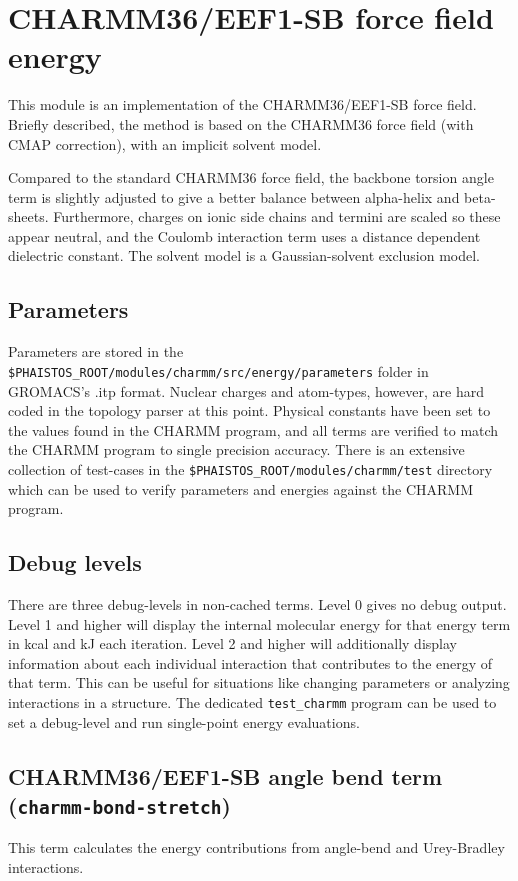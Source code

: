 \section{CHARMM36/EEF1-SB force field energy}

This module is an implementation of the CHARMM36/EEF1-SB force field\cite{doi:10.1021/ct400730n}.
Briefly described, the method is based on the CHARMM36 force field (with CMAP correction), with an implicit solvent model.

Compared to the standard CHARMM36 force field, the backbone torsion angle term is slightly adjusted to give a better balance between alpha-helix and beta-sheets.
Furthermore, charges on ionic side chains and termini are scaled so these appear neutral, and the Coulomb interaction term uses a distance dependent dielectric constant.
The solvent model is a Gaussian-solvent exclusion model.

\subsection{Parameters}
Parameters are stored in the \texttt{\$PHAISTOS\_ROOT/modules/charmm/src/energy/parameters} folder in GROMACS's .itp format.
Nuclear charges and atom-types, however, are hard coded in the topology parser at this point.
Physical constants have been set to the values found in the CHARMM program, and all terms are verified to match the CHARMM program to single precision accuracy.
There is an extensive collection of test-cases in the \texttt{\$PHAISTOS\_ROOT/modules/charmm/test} directory which can be used to verify parameters and energies against the CHARMM program.


\subsection{Debug levels}
There are three debug-levels in non-cached terms.
Level 0 gives no debug output. 
Level 1 and higher will display the internal molecular energy for that energy term in kcal and kJ each iteration.
Level 2 and higher will additionally display information about each individual interaction that contributes to the energy of that term.
This can be useful for situations like changing parameters or analyzing interactions in a structure.
The dedicated \texttt{test\_charmm} program can be used to set a debug-level and run single-point energy evaluations.


\subsection{CHARMM36/EEF1-SB angle bend term\\(\texttt{charmm-bond-stretch})}
This term calculates the energy contributions from angle-bend and Urey-Bradley interactions.


